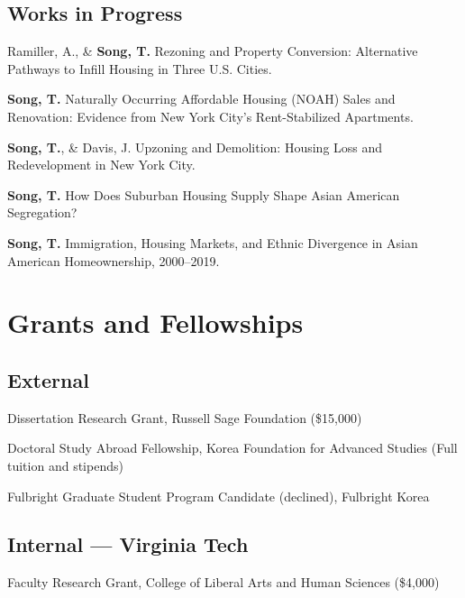 \documentclass[11pt,letterpaper]{article}
\newcommand{\spitem}{\Needspace{2.6\baselineskip}\item} %
\newcommand{\money}[1]{(\$#1)}
\newcommand{\term}[1]{(#1)}
\begin{document}
\subsection{Works in Progress}
\begin{subpoints}
  \spitem Ramiller, A., \& \textbf{Song, T.} Rezoning and Property Conversion: Alternative Pathways to Infill Housing in Three U.S. Cities.
  \spitem \textbf{Song, T.} Naturally Occurring Affordable Housing (NOAH) Sales and Renovation: Evidence from New York City's Rent-Stabilized Apartments.
  \spitem \textbf{Song, T.}, \& Davis, J. Upzoning and Demolition: Housing Loss and Redevelopment in New York City.
  \spitem \textbf{Song, T.} How Does Suburban Housing Supply Shape Asian American Segregation?
  \spitem \textbf{Song, T.} Immigration, Housing Markets, and Ethnic Divergence in Asian American Homeownership, 2000--2019.
\end{subpoints}

\section{Grants and Fellowships}

\subsection{External}
\begin{tablist}
  \item[2025] \tab{}Dissertation Research Grant, Russell Sage Foundation \money{15,000}
  \item[2021--26] \tab{}Doctoral Study Abroad Fellowship, Korea Foundation for Advanced Studies \term{Full tuition and stipends}
  \item[2020] \tab{}Fulbright Graduate Student Program Candidate \term{declined}, Fulbright Korea
\end{tablist}

\subsection{Internal --- Virginia Tech}
\begin{tablist}
  \item[2026] \tab{}Faculty Research Grant, College of Liberal Arts and Human Sciences \money{4,000}
\end{tablist}
\end{document}
